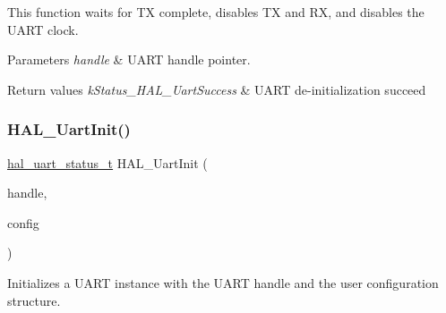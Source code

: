 This function waits for TX complete, disables TX and RX, and disables the U\+A\+RT clock.


\begin{DoxyParams}{Parameters}
{\em handle} & U\+A\+RT handle pointer. \\
\hline
\end{DoxyParams}

\begin{DoxyRetVals}{Return values}
{\em k\+Status\+\_\+\+H\+A\+L\+\_\+\+Uart\+Success} & U\+A\+RT de-\/initialization succeed \\
\hline
\end{DoxyRetVals}
\mbox{\label{group___u_a_r_t___adapter_gac234c4bcffe995d8aa1b2392162af796}} 
\subsubsection{\texorpdfstring{HAL\_UartInit()}{HAL\_UartInit()}}
{\footnotesize\ttfamily \mbox{\hyperlink{group___u_a_r_t___adapter_ga352ee9bdc398eba4262ca7656f9c5e50}{hal\+\_\+uart\+\_\+status\+\_\+t}} H\+A\+L\+\_\+\+Uart\+Init (\begin{DoxyParamCaption}\item[{hal\+\_\+uart\+\_\+handle\+\_\+t}]{handle,  }\item[{\mbox{\hyperlink{group___u_a_r_t___adapter_ga1545cbd3c961cbe725ed2a75ffc5a999}{hal\+\_\+uart\+\_\+config\+\_\+t}} $\ast$}]{config }\end{DoxyParamCaption})}



Initializes a U\+A\+RT instance with the U\+A\+RT handle and the user configuration structure. 

